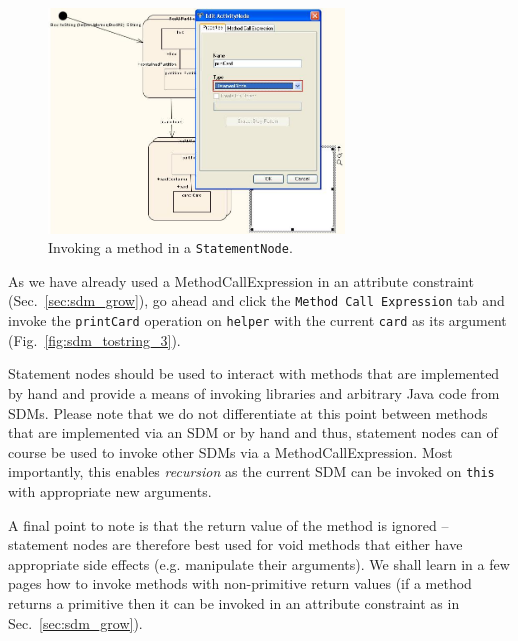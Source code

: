 \begin{figure}[htbp]
\begin{center}
  \includegraphics[width=0.7\textwidth]{pics/sdmBilder/toString/sdm73}
  \caption{Invoking a method in a \texttt{StatementNode}.}  
  \label{fig:sdm_tostring_2}
\end{center}
\end{figure}

As we have already used a MethodCallExpression in an attribute constraint
(Sec.~\ref{sec:sdm_grow}), go ahead and click the \texttt{Method Call
Expression} tab and invoke the \texttt{printCard} operation on \texttt{helper}
with the current \texttt{card} as its argument (Fig.~\ref{fig:sdm_tostring_3}).

Statement nodes should be used to interact with methods that are
implemented by hand and provide a means of invoking libraries and arbitrary Java
code from SDMs.  Please note that we do not differentiate at this point between
methods that are implemented via an SDM or by hand and thus, statement nodes can
of course be used to invoke other SDMs via a MethodCallExpression.  Most
importantly, this enables \emph{recursion} as the current SDM can be invoked on
\texttt{this} with appropriate new arguments.  

A final point to note is that the
return value of the method is ignored -- statement nodes are therefore best used
for void methods that either have appropriate side effects (e.g. manipulate
their arguments).  We shall learn in a few pages how to invoke methods with
non-primitive return values (if a method returns a primitive then it can be
invoked in an attribute constraint as in Sec.~\ref{sec:sdm_grow}).

